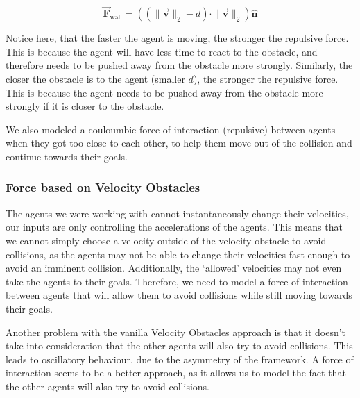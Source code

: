 \documentclass[a4paper,12pt]{article}
\begin{document}
\begin{equation}
    \overrightarrow{\mathbf{F}}_{\text{wall}} = \left(\left(\|\overrightarrow{\mathbf{v}}\|_{2} - d\right) \cdot \|\overrightarrow{\mathbf{v}}\|_{2}\right)  \hat{\mathbf{n}}
    \label{eq:potential_field}
\end{equation}

Notice here, that the faster the agent is moving, the stronger the repulsive force. This is because the agent will have less time to react to the obstacle, and therefore needs to be pushed away from the obstacle more strongly. Similarly, the closer the obstacle is to the agent (smaller $d$), the stronger the repulsive force. This is because the agent needs to be pushed away from the obstacle more strongly if it is closer to the obstacle.

We also modeled a couloumbic force of interaction (repulsive) between agents when they got too close to each other, to help them move out of the collision and continue towards their goals.

\subsubsection{Force based on Velocity Obstacles}
\label{method_collision_velocity}


The agents we were working with cannot instantaneously change their velocities, our inputs are only controlling the accelerations of the agents. This means that we cannot simply choose a velocity outside of the velocity obstacle to avoid collisions, as the agents may not be able to change their velocities fast enough to avoid an imminent collision. Additionally, the `allowed' velocities may not even take the agents to their goals. Therefore, we need to model a force of interaction between agents that will allow them to avoid collisions while still moving towards their goals.

Another problem with the vanilla Velocity Obstacles approach is that it doesn't take into consideration that the other agents will also try to avoid collisions. This leads to oscillatory behaviour, due to the asymmetry of the framework. A force of interaction seems to be a better approach, as it allows us to model the fact that the other agents will also try to avoid collisions.

\end{document}
